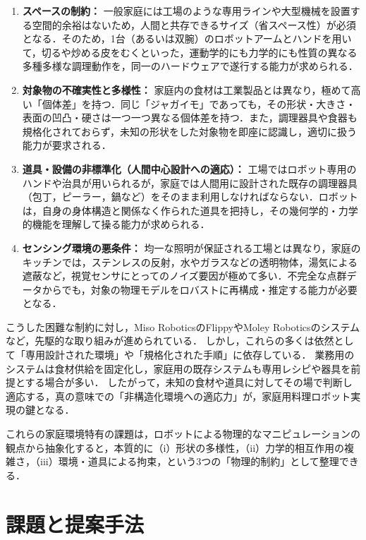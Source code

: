 \begin{enumerate}
    \item \textbf{スペースの制約：} 一般家庭には工場のような専用ラインや大型機械を設置する空間的余裕はないため，人間と共存できるサイズ（省スペース性）が必須となる．そのため，1台（あるいは双腕）のロボットアームとハンドを用いて，切るや炒める皮をむくといった，運動学的にも力学的にも性質の異なる多種多様な調理動作を，同一のハードウェアで遂行する能力が求められる．
    
    \item \textbf{対象物の不確実性と多様性：} 家庭内の食材は工業製品とは異なり，極めて高い「個体差」を持つ．同じ「ジャガイモ」であっても，その形状・大きさ・表面の凹凸・硬さは一つ一つ異なる個体差を持つ．また，調理器具や食器も規格化されておらず，未知の形状をした対象物を即座に認識し，適切に扱う能力が要求される．

    \item \textbf{道具・設備の非標準化（人間中心設計への適応）：} 工場ではロボット専用のハンドや治具が用いられるが，家庭では人間用に設計された既存の調理器具（包丁，ピーラー，鍋など）をそのまま利用しなければならない．ロボットは，自身の身体構造と関係なく作られた道具を把持し，その幾何学的・力学的機能を理解して操る能力が求められる．

    \item \textbf{センシング環境の悪条件：} 均一な照明が保証される工場とは異なり，家庭のキッチンでは，ステンレスの反射，水やガラスなどの透明物体，湯気による遮蔽など，視覚センサにとってのノイズ要因が極めて多い．不完全な点群データからでも，対象の物理モデルをロバストに再構成・推定する能力が必要となる．
\end{enumerate}


こうした困難な制約に対し，Miso RoboticsのFlippy\cite{miso2025flippy_nextgen}やMoley Roboticsのシステムなど，先駆的な取り組みが進められている．
しかし，これらの多くは依然として「専用設計された環境」や「規格化された手順」に依存している．
業務用のシステムは食材供給を固定化し，家庭用の既存システムも専用レシピや器具を前提とする場合が多い．
したがって，未知の食材や道具に対してその場で判断し適応する，真の意味での「非構造化環境への適応力」が，家庭用料理ロボット実現の鍵となる．

これらの家庭環境特有の課題は，ロボットによる物理的なマニピュレーションの観点から抽象化すると，本質的に（i）形状の多様性，（ii）力学的相互作用の複雑さ，（iii）環境・道具による拘束，という3つの「物理的制約」として整理できる．


\section{課題と提案手法}

